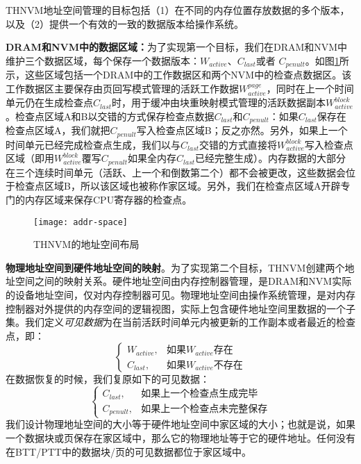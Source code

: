 THNVM地址空间管理的目标包括（1）在不同的内存位置存放数据的多个版本，以及（2）提供一个有效的一致的数据版本给操作系统。

\textbf{DRAM和NVM中的数据区域：}为了实现第一个目标，我们在DRAM和NVM中维护三个数据区域，每个保存一个数据版本：$W_{active}$、$C_{last}$或者 $C_{penult}$。如图\ref{fig-addr-space}所示，这些区域包括一个DRAM中的工作数据区和两个NVM中的检查点数据区。该工作数据区主要保存由页回写模式管理的活跃工作数据$W^{page}_{active}$，同时在上一个时间单元仍在生成检查点$C_{last}$时，用于缓冲由块重映射模式管理的活跃数据副本$W^{block}_{active}$。检查点区域A和B以交错的方式保存检查点数据$C_{last}$和$C_{penult}$：如果$C_{last}$保存在检查点区域A，我们就把$C_{penult}$写入检查点区域B；反之亦然。另外，如果上一个时间单元已经完成检查点生成，我们以与$C_{last}$交错的方式直接将$W^{block}_{active}$写入检查点区域（即用$W^{block}_{active}$覆写$C_{penult}$如果全内存$C_{last}$已经完整生成）。内存数据的大部分在三个连续时间单元（活跃、上一个和倒数第二个）都不会被更改，这些数据会位于检查点区域B，所以该区域也被称作家区域。另外，我们在检查点区域A开辟专门的内存区域来保存CPU寄存器的检查点。 

\begin{figure}[!h]
\centering
\texttt{[image: addr-space]}
\caption{THNVM的地址空间布局}
\label{fig-addr-space}
\end{figure}

\textbf{物理地址空间到硬件地址空间的映射}。为了实现第二个目标，THNVM创建两个地址空间之间的映射关系。硬件地址空间由内存控制器管理，是DRAM和NVM实际的设备地址空间，仅对内存控制器可见。物理地址空间由操作系统管理，是对内存控制器对外提供的内存空间的逻辑视图，实际上包含硬件地址空间里数据的一个子集。我们定义\emph{可见数据}为在当前活跃时间单元内被更新的工作副本或者最近的检查点，即： 
\[
\begin{cases}
        W_{active}, & \text{如果}W_{active}\text{存在}\\
        C_{last}, & \text{如果}W_{active}\text{不存在}
\end{cases}
\]
在数据恢复的时候，我们复原如下的可见数据： 
\[
\begin{cases}
        C_{last}, & \text{如果上一个检查点生成完毕}\\
        C_{penult}, & \text{如果上一个检查点未完整保存}
\end{cases}
\]
我们设计物理地址空间的大小等于硬件地址空间中家区域的大小；也就是说，如果一个数据块或页保存在家区域中，那么它的物理地址等于它的硬件地址。任何没有在BTT/PTT中的数据块/页的可见数据都位于家区域中。


